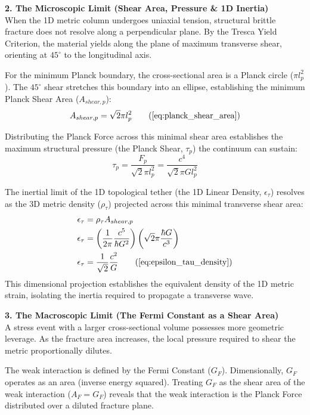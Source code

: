 \textbf{2. The Microscopic Limit (Shear Area, Pressure \& 1D Inertia)}\\
When the 1D metric column undergoes uniaxial tension, structural brittle fracture does not resolve along a perpendicular plane. By the Tresca Yield Criterion, the material yields along the plane of maximum transverse shear, orienting at $45^\circ$ to the longitudinal axis.

For the minimum Planck boundary, the cross-sectional area is a Planck circle ($\pi l_p^2$). The $45^\circ$ shear stretches this boundary into an ellipse, establishing the minimum Planck Shear Area ($A_{shear, p}$):
\begin{equation}
    A_{shear, p} = \sqrt{2}\pi l_p^2 \tag{\ref{eq:planck_shear_area}}
\end{equation}

Distributing the Planck Force across this minimal shear area establishes the maximum structural pressure (the Planck Shear, $\tau_p$) the continuum can sustain:
\begin{equation}
    \tau_p = \frac{F_p}{\sqrt{2}\pi l_p^2} = \frac{c^4}{\sqrt{2}\pi G l_p^2} \label{eq:planck_shear_pressure}
\end{equation}

The inertial limit of the 1D topological tether (the 1D Linear Density, $\epsilon_\tau$) resolves as the 3D metric density ($\rho_\tau$) projected across this minimal transverse shear area:
\begin{align}
    \epsilon_\tau &= \rho_\tau A_{shear, p} \nonumber \\
    \epsilon_\tau &= \left( \frac{1}{2\pi} \frac{c^5}{\hbar G^2} \right) \left( \sqrt{2}\pi \frac{\hbar G}{c^3} \right) \nonumber \\
    \epsilon_\tau &= \frac{1}{\sqrt{2}} \frac{c^2}{G} \tag{\ref{eq:epsilon_tau_density}} 
\end{align}
This dimensional projection establishes the equivalent density of the 1D metric strain, isolating the inertia required to propagate a transverse wave.

\vspace{0.2 cm}

\textbf{3. The Macroscopic Limit (The Fermi Constant as a Shear Area)}\\
A stress event with a larger cross-sectional volume possesses more geometric leverage. As the fracture area increases, the local pressure required to shear the metric proportionally dilutes.

The weak interaction is defined by the Fermi Constant ($G_F$). Dimensionally, $G_F$ operates as an area (inverse energy squared). Treating $G_F$ as the shear area of the weak interaction ($A_F = G_F$) reveals that the weak interaction is the Planck Force distributed over a diluted fracture plane.

